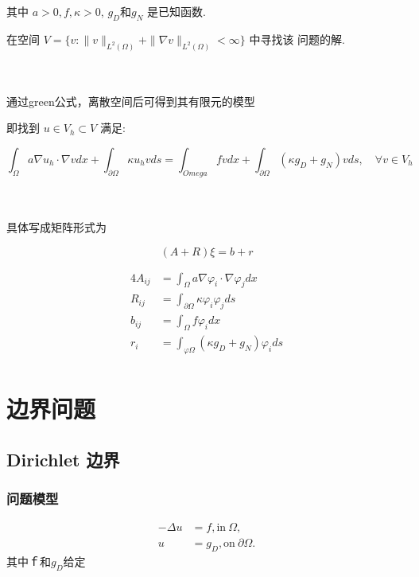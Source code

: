 \documentclass{article}
\begin{document}
其中 $a>0,f,\kappa>0$, $g_D$和$g_N$ 是已知函数.

在空间 $V=\{v:\|v\|_{L^2(\Omega)}+\|\nabla v\|_{L^2(\Omega)}<\infty\}$ 中寻找该
问题的解.

\\ \hspace*{\fill} \\

通过green公式，离散空间后可得到其有限元的模型

即找到 $u\in V_h\subset V$ 满足:

\begin{equation}
\int_{\Omega}a\nabla u_h\cdot\nabla vdx+\int_{\partial\Omega}\kappa
u_hvds=\int_{Omega}fvdx+\int_{\partial\Omega}(\kappa g_D+g_N)vds,\quad\forall
v\in V_h
\end{equation}

\\ \hspace*{\fill} \\

具体写成矩阵形式为

$$
(A+R)\xi=b+r
$$

\begin{alignat}{4}
	A_{ij} & =\int_{\Omega}a\nabla\varphi_i\cdot\nabla\varphi_jdx \\
	R_{ij} & =\int_{\partial\Omega}\kappa\varphi_i\varphi_jds \\
	b_{ij} & =\int_{\Omega}f\varphi_idx \\
	r_i & =\int_{\varphi\Omega}(\kappa g_D+g_N)\varphi_ids \\
\end{alignat}

\section{边界问题}

\subsection{Dirichlet 边界}
\subsubsection{问题模型}
\begin{equation}
    \begin{aligned}
        - \Delta u & = f, \text{in} \ \Omega, \\
        u & = g_D, \text{on}\ \partial \Omega.
    \end{aligned}
\end{equation}
其中ｆ和$g_D$给定
\end{document}
